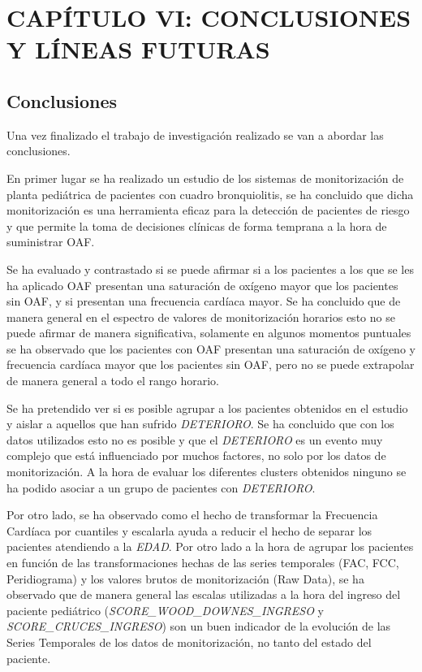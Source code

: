 \section{CAPÍTULO VI: CONCLUSIONES Y LÍNEAS FUTURAS}\label{cap:conclusionesANDlineasfuturas}

\subsection{Conclusiones}\label{sec:conclusiones}

Una vez finalizado el trabajo de investigación realizado se van a abordar las conclusiones. 

En primer lugar se ha realizado un estudio de los sistemas de monitorización de planta pediátrica de pacientes con cuadro bronquiolitis, se ha concluido que dicha monitorización es una herramienta eficaz para la detección de pacientes de riesgo y que permite la toma de decisiones clínicas de forma temprana a la hora de suministrar OAF.

Se ha evaluado y contrastado si se puede afirmar si a los pacientes a los que se les ha aplicado OAF presentan una saturación de oxígeno mayor que los pacientes sin OAF, y si presentan una frecuencia cardíaca mayor. Se ha concluido que de manera general en el espectro de valores de monitorización horarios esto no se puede afirmar de manera significativa, solamente en algunos momentos puntuales se ha observado que los pacientes con OAF presentan una saturación de oxígeno y frecuencia cardíaca mayor que los pacientes sin OAF, pero no se puede extrapolar de manera general a todo el rango horario. 

Se ha pretendido ver si es posible agrupar a los pacientes obtenidos en el estudio y aislar a aquellos que han sufrido \textit{DETERIORO}. Se ha concluido que con los datos utilizados esto no es posible y que el \textit{DETERIORO} es un evento muy complejo que está influenciado por muchos factores, no solo por los datos de monitorización. A la hora de evaluar los diferentes clusters obtenidos ninguno se ha podido asociar a un grupo de pacientes con \textit{DETERIORO}.

Por otro lado, se ha observado como el hecho de transformar la Frecuencia Cardíaca por cuantiles y escalarla ayuda a reducir el hecho de separar los pacientes atendiendo a la \textit{EDAD}. Por otro lado a la hora de agrupar los pacientes en función de las transformaciones hechas de las series temporales (FAC, FCC, Peridiograma) y los valores brutos de monitorización (Raw Data), se ha observado que de manera general las escalas utilizadas a la hora del ingreso del paciente pediátrico (\textit{SCORE\_WOOD\_DOWNES\_INGRESO} y \textit{SCORE\_CRUCES\_INGRESO}) son un buen indicador de la evolución de las Series Temporales de los datos de monitorización, no tanto del estado del paciente. 

